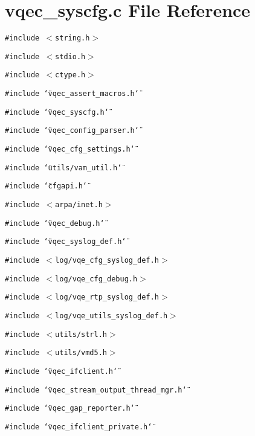 \section{vqec\_\-syscfg.c File Reference}
\label{vqec__syscfg_8c}
{\tt \#include $<$string.h$>$}\par
{\tt \#include $<$stdio.h$>$}\par
{\tt \#include $<$ctype.h$>$}\par
{\tt \#include \char`\"{}vqec\_\-assert\_\-macros.h\char`\"{}}\par
{\tt \#include \char`\"{}vqec\_\-syscfg.h\char`\"{}}\par
{\tt \#include \char`\"{}vqec\_\-config\_\-parser.h\char`\"{}}\par
{\tt \#include \char`\"{}vqec\_\-cfg\_\-settings.h\char`\"{}}\par
{\tt \#include \char`\"{}utils/vam\_\-util.h\char`\"{}}\par
{\tt \#include \char`\"{}cfgapi.h\char`\"{}}\par
{\tt \#include $<$arpa/inet.h$>$}\par
{\tt \#include \char`\"{}vqec\_\-debug.h\char`\"{}}\par
{\tt \#include \char`\"{}vqec\_\-syslog\_\-def.h\char`\"{}}\par
{\tt \#include $<$log/vqe\_\-cfg\_\-syslog\_\-def.h$>$}\par
{\tt \#include $<$log/vqe\_\-cfg\_\-debug.h$>$}\par
{\tt \#include $<$log/vqe\_\-rtp\_\-syslog\_\-def.h$>$}\par
{\tt \#include $<$log/vqe\_\-utils\_\-syslog\_\-def.h$>$}\par
{\tt \#include $<$utils/strl.h$>$}\par
{\tt \#include $<$utils/vmd5.h$>$}\par
{\tt \#include \char`\"{}vqec\_\-ifclient.h\char`\"{}}\par
{\tt \#include \char`\"{}vqec\_\-stream\_\-output\_\-thread\_\-mgr.h\char`\"{}}\par
{\tt \#include \char`\"{}vqec\_\-gap\_\-reporter.h\char`\"{}}\par
{\tt \#include \char`\"{}vqec\_\-ifclient\_\-private.h\char`\"{}}\par
